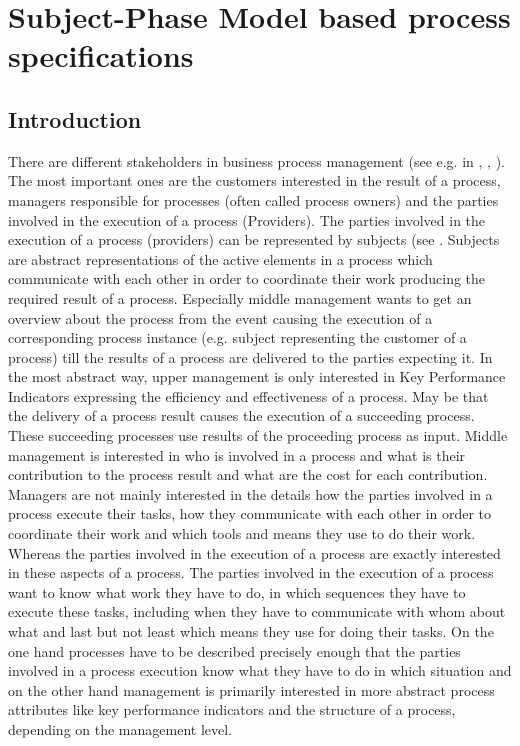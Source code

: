 \newpage
\section {Subject-Phase Model based process specifications}

\subsection{Introduction}

There are different stakeholders in business process management (see e.g. in \cite{art:Stakeholder}, \cite{book:Worklow-Mod}, \cite{book:BPM-Handbook2}). The most important ones are the customers interested in the result of a process, managers responsible for processes (often called process owners) and the parties involved in the execution of a process (Providers). The parties involved in the execution of a process (providers) can be represented by subjects (see \cite{book:flei2011}. Subjects are abstract representations of the active elements in a process which communicate with each other in order to coordinate their work producing the required result of a process. Especially middle management wants to get an overview about the process from the event causing the execution of a corresponding process instance (e.g. subject representing the customer of a process) till the results of a process are delivered to the parties expecting it. In the most abstract way, upper management is only interested in Key Performance Indicators expressing the efficiency and effectiveness of a process. May be that the delivery of a process result causes the execution of a succeeding process. These succeeding processes use results of the proceeding process as input.
Middle management is interested in who is involved in a process and what  is their contribution to the process result and what are the cost for each contribution. Managers are not mainly interested in the details how the parties involved in a process execute their tasks, how they communicate with each other in order to coordinate their work and which tools and means they use to do their work. Whereas the parties involved in the execution of a process are exactly interested in these aspects of a process. The parties involved in the execution of a process want to know what work they have to do, in which sequences they have to execute these tasks, including when they have to communicate with whom about what and last but not least which means they use for doing their tasks.
On the one hand processes have to be described precisely enough that the parties involved in a process execution know what they have to do in which situation and on the other hand management is primarily interested in more abstract process attributes like key performance indicators and the structure of a process, depending on the management level.\\

